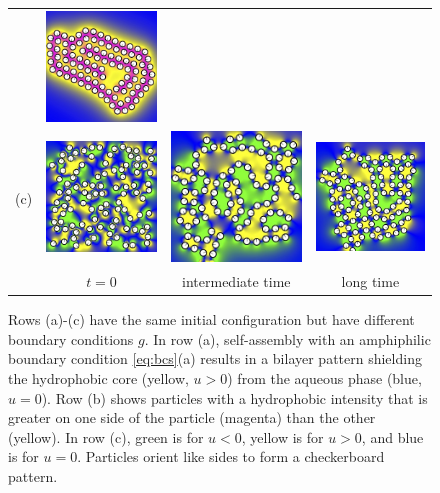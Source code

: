 \begin{figure}[h!]
\begin{center}
\begin{tabular}{m{0.1cm}m{1.8in}m{1.8in}m{1.8in}}
      &\includegraphics[width=1.8in]{figures/N100C3.jpg}    \\
    (c)
      &\includegraphics[width=1.8in]{figures/N100A1.jpg}
      &\includegraphics[width=1.8in]{figures/N100A2.jpg}
      &\includegraphics[width=1.8in]{figures/N100A3.jpg}    \\
      &\multicolumn{1}{c}{$t = 0$}
      &\multicolumn{1}{c}{intermediate time}
      &\multicolumn{1}{c}{long time}
  \end{tabular}
  \end{center}
  \vspace{-20pt}
  \caption{\footnotesize
    \label{fig:self-assembly}
    Rows (a)-(c) have the same initial configuration
    but have different boundary conditions $g.$ 
    In row (a), self-assembly with an amphiphilic boundary
    condition \eqref{eq:bcs}(a) results in a bilayer pattern shielding
    the hydrophobic core (yellow, $u > 0$) from the aqueous phase (blue, $u = 0$).
    Row (b) shows particles with a hydrophobic intensity that is
    greater on one side of the particle (magenta) than the other (yellow).
    In row (c), green is for $u < 0$, yellow is for $u > 0$, and blue is for $u = 0$.
    Particles orient like sides to form a checkerboard pattern.\\
  }
\end{figure}

